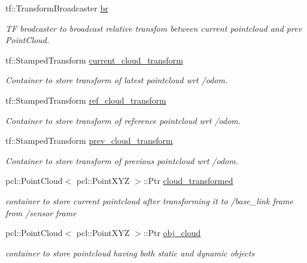 \begin{DoxyCompactItemize}
tf\+::\+Transform\+Broadcaster \hyperlink{classdatmo_1_1cloud__segmentation_aa2712034cbe68df4d19b0fcf87f9b465}{br}
\begin{DoxyCompactList}\small\item\em TF brodcaster to broadcast relative transfom between current pointcloud and prev Point\+Cloud. \end{DoxyCompactList}\item 
tf\+::\+Stamped\+Transform \hyperlink{classdatmo_1_1cloud__segmentation_a2c01dc948f63510a421297e7cc6a29e5}{current\+\_\+cloud\+\_\+transform}
\begin{DoxyCompactList}\small\item\em Container to store transform of latest pointcloud wrt /odom. \end{DoxyCompactList}\item 
tf\+::\+Stamped\+Transform \hyperlink{classdatmo_1_1cloud__segmentation_a8ab8642656cda3d94db8d9c2e4613644}{ref\+\_\+cloud\+\_\+transform}
\begin{DoxyCompactList}\small\item\em Container to store transform of reference pointcloud wrt /odom. \end{DoxyCompactList}\item 
tf\+::\+Stamped\+Transform \hyperlink{classdatmo_1_1cloud__segmentation_af664f016cfef835a3cfc303675c0a5ec}{prev\+\_\+cloud\+\_\+transform}
\begin{DoxyCompactList}\small\item\em Container to store transform of previous pointcloud wrt /odom. \end{DoxyCompactList}\item 
pcl\+::\+Point\+Cloud$<$ pcl\+::\+Point\+X\+YZ $>$\+::Ptr \hyperlink{classdatmo_1_1cloud__segmentation_a00e99233257fe5a28a039eef13dbc65b}{cloud\+\_\+transformed}
\begin{DoxyCompactList}\small\item\em container to store current pointcloud after transforming it to /base\+\_\+link frame from /sensor frame \end{DoxyCompactList}\item 
pcl\+::\+Point\+Cloud$<$ pcl\+::\+Point\+X\+YZ $>$\+::Ptr \hyperlink{classdatmo_1_1cloud__segmentation_ad946a48ab59bf9f48338f9ef0702181c}{obj\+\_\+cloud}
\begin{DoxyCompactList}\small\item\em container to store pointcloud having both static and dynamic objects \end{DoxyCompactList}\item 

\end{DoxyCompactItemize}

